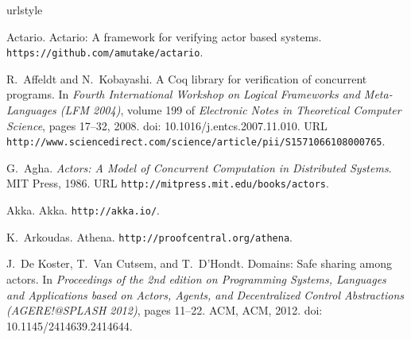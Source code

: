 \documentclass[10pt]{sigplanconf}
\begin{document}



\newpage %













\begin{thebibliography}{15}
\softraggedright
\providecommand{\natexlab}[1]{#1}
\providecommand{\url}[1]{\texttt{#1}}
\expandafter\ifx\csname urlstyle\endcsname\relax
  \providecommand{\doi}[1]{doi: #1}\else
  \providecommand{\doi}{doi: \begingroup \urlstyle{rm}\Url}\fi

Actario.
\newblock Actario: A framework for verifying actor based systems.
\newblock \url{https://github.com/amutake/actario}.

R.~Affeldt and N.~Kobayashi.
\newblock A {Coq} library for verification of concurrent programs.
\newblock In \emph{Fourth International Workshop on Logical Frameworks and
  Meta-Languages (LFM 2004)}, volume 199 of \emph{Electronic Notes in
  Theoretical Computer Science}, pages 17--32, 2008.
\newblock \doi{10.1016/j.entcs.2007.11.010}.
\newblock URL
  \url{http://www.sciencedirect.com/science/article/pii/S1571066108000765}.

G.~Agha.
\newblock \emph{Actors: A Model of Concurrent Computation in Distributed
  Systems}.
\newblock MIT Press, 1986.
\newblock URL \url{http://mitpress.mit.edu/books/actors}.

Akka.
\newblock Akka.
\newblock \url{http://akka.io/}.

K.~Arkoudas.
\newblock Athena.
\newblock \url{http://proofcentral.org/athena}.

J.~{De Koster}, T.~{Van Cutsem}, and T.~D'Hondt.
\newblock Domains: Safe sharing among actors.
\newblock In \emph{Proceedings of the 2nd edition on Programming Systems,
  Languages and Applications based on Actors, Agents, and Decentralized Control
  Abstractions (AGERE!@SPLASH 2012)}, pages 11--22. ACM, ACM, 2012.
\newblock \doi{10.1145/2414639.2414644}.


\end{thebibliography}
\end{document}
